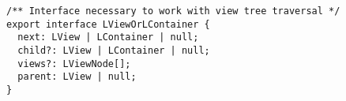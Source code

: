 \begin{verbatim}
/** Interface necessary to work with view tree traversal */
export interface LViewOrLContainer {
  next: LView | LContainer | null;
  child?: LView | LContainer | null;
  views?: LViewNode[];
  parent: LView | null;
}
\end{verbatim}
